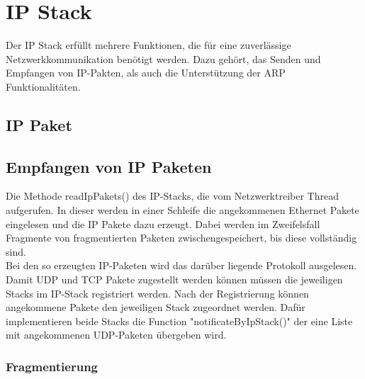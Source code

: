 \section{IP Stack}
Der IP Stack erfüllt mehrere Funktionen, die für eine zuverlässige Netzwerkkommunikation benötigt werden. Dazu gehört, das Senden und Empfangen von IP-Pakten, als auch die Unterstützung der ARP Funktionalitäten.

\subsection{IP Paket}

\subsection{Empfangen von IP Paketen}

Die Methode readIpPakets() des IP-Stacks, die vom Netzwerktreiber Thread aufgerufen. In dieser werden in einer Schleife die angekommenen Ethernet Pakete eingelesen und die IP Pakete dazu erzeugt. Dabei werden im Zweifelsfall Fragmente von fragmentierten Paketen zwischengespeichert, bis diese vollständig sind. \\
Bei den so erzeugten IP-Paketen wird das darüber liegende Protokoll ausgelesen.\\
Damit UDP und TCP Pakete zugestellt werden können müssen die jeweiligen Stacks im IP-Stack registriert werden. Nach der Registrierung können angekommene  Pakete den jeweiligen Stack zugeordnet werden. Dafür implementieren beide Stacks die Function "notificateByIpStack()" der eine Liste mit angekommenen UDP-Paketen übergeben wird. 

\subsubsection{Fragmentierung}

